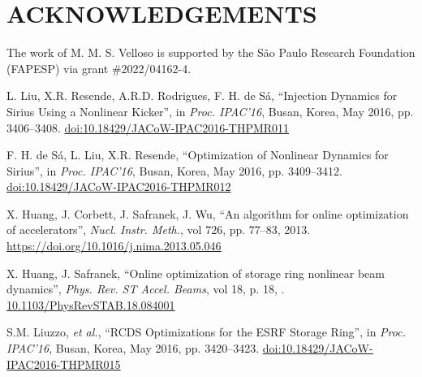 \documentclass[a4paper,
               keeplastbox,   %
               ]{jacow}
\begin{document}
\section{ACKNOWLEDGEMENTS}
The work of M. M. S. Velloso is supported by the São Paulo Research Foundation (FAPESP) via grant \#2022/04162-4.
%
%
	
	\begin{thebibliography}{9} %
	
        

        L. Liu, X.R. Resende, A.R.D. Rodrigues, F. H. de Sá,
       \textquotedblleft{{I}njection {D}ynamics for {S}irius {U}sing a {N}onlinear {K}icker}\textquotedblright,
       in \emph{Proc. IPAC’16}, Busan, Korea, May 2016, pp. 3406--3408.
       \url{doi:10.18429/JACoW-IPAC2016-THPMR011} 
 
        F. H. de Sá, L. Liu, X.R. Resende,
       \textquotedblleft{{O}ptimization of {N}onlinear {D}ynamics for {S}irius}\textquotedblright,
       in \emph{Proc. IPAC’16}, Busan, Korea, May 2016, pp. 3409--3412.
       \url{doi:10.18429/JACoW-IPAC2016-THPMR012}       
       
		X. Huang, J. Corbett, J. Safranek, J. Wu,
		\textquotedblleft{An algorithm for online optimization of accelerators}\textquotedblright,
		\emph{Nucl.  Instr. Meth.}, vol 726, pp. 77--83, 2013.
        \url{https://doi.org/10.1016/j.nima.2013.05.046} 

		X. Huang, J. Safranek,
		\textquotedblleft{Online optimization of storage ring nonlinear beam dynamics}\textquotedblright,
		\emph{Phys. Rev. ST Accel. Beams}, vol 18, p. 18, .
        \url{10.1103/PhysRevSTAB.18.084001} 
 
        S.M. Liuzzo, \emph{et al.},
        \textquotedblleft{RCDS Optimizations for the ESRF Storage Ring}\textquotedblright,
        in \emph{Proc. IPAC’16}, Busan, Korea, May 2016, pp. 3420--3423.
       \url{doi:10.18429/JACoW-IPAC2016-THPMR015}   
    

\end{thebibliography}
\end{document}
